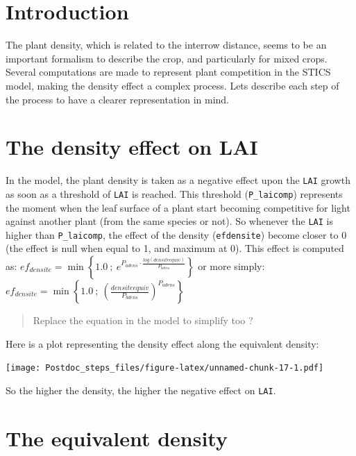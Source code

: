 \documentclass[
]{book}
\begin{document}
\hypertarget{introduction-2}{%
\section{Introduction}\label{introduction-2}}

The plant density, which is related to the interrow distance, seems to be an important formalism to describe the crop, and particularly for mixed crops. Several computations are made to represent plant competition in the STICS model, making the density effect a complex process. Lets describe each step of the process to have a clearer representation in mind.

\hypertarget{the-density-effect-on-lai}{%
\section{The density effect on LAI}\label{the-density-effect-on-lai}}

In the model, the plant density is taken as a negative effect upon the \texttt{LAI} growth as soon as a threshold of \texttt{LAI} is reached. This threshold (\texttt{P\_laicomp}) represents the moment when the leaf surface of a plant start becoming competitive for light against another plant (from the same species or not). So whenever the \texttt{LAI} is higher than \texttt{P\_laicomp}, the effect of the density (\texttt{efdensite}) become closer to 0 (the effect is null when equal to 1, and maximum at 0).
This effect is computed as:
\(ef_{densite}=\min\left\{1.0\ ;\ e^{P_{adens}\cdot\frac{log(densiteequiv)}{P_{bdens}}}\right\}\)
or more simply:
\(ef_{densite}=\min\left\{1.0\ ;\ (\frac{densiteequiv}{P_{bdens}})^{P_{adens}}\right\}\)

\begin{quote}
Replace the equation in the model to simplify too ?
\end{quote}

Here is a plot representing the density effect along the equivalent density:

\texttt{[image: Postdoc\_steps\_files/figure-latex/unnamed-chunk-17-1.pdf]}

So the higher the density, the higher the negative effect on \texttt{LAI}.

\hypertarget{the-equivalent-density}{%
\section{The equivalent density}\label{the-equivalent-density}}
\end{document}
